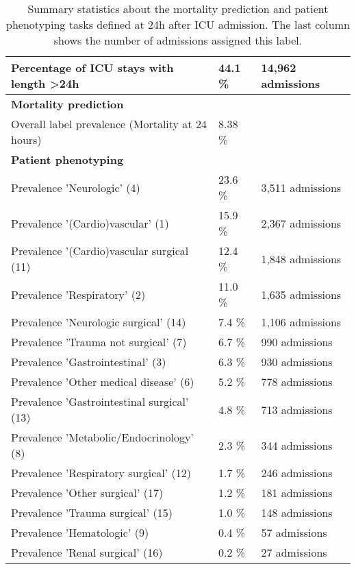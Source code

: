 \documentclass{article}
\begin{document}
\begin{table}[ht!]
\caption{Summary statistics about the mortality prediction and
patient phenotyping tasks defined at 24h after ICU admission. The last
column shows the number of admissions assigned this label.}
\footnotesize
\begin{center}
{\selectfont\small
\begin{tabular}{lll}
\toprule
Percentage of ICU stays with length >24h & 44.1 \% & 14,962 admissions \\
\midrule
\textbf{Mortality prediction} & & \\
\midrule
Overall label prevalence (Mortality at 24 hours) & 8.38 \% & \\
\midrule
\textbf{Patient phenotyping} & & \\
\midrule
Prevalence 'Neurologic' (4) & 23.6 \% & 3,511 admissions \\
Prevalence '(Cardio)vascular' (1) & 15.9 \% & 2,367 admissions \\
Prevalence '(Cardio)vascular surgical (11) & 12.4 \% & 1,848 admissions \\ 
Prevalence 'Respiratory' (2) & 11.0 \% & 1,635 admissions \\
Prevalence 'Neurologic surgical' (14) & 7.4 \% & 1,106 admissions \\
Prevalence 'Trauma not surgical' (7) & 6.7 \% & 990 admissions \\
Prevalence 'Gastrointestinal' (3) & 6.3 \% & 930 admissions \\ 
Prevalence 'Other medical disease' (6) & 5.2 \% & 778 admissions \\ 
Prevalence 'Gastrointestinal surgical' (13) & 4.8 \% & 713 admissions \\
Prevalence 'Metabolic/Endocrinology' (8) & 2.3 \% & 344 admissions \\ 
Prevalence 'Respiratory surgical' (12) & 1.7 \% & 246 admissions \\
Prevalence 'Other surgical' (17) & 1.2 \% & 181 admissions \\
Prevalence 'Trauma surgical' (15) & 1.0 \% & 148 admissions \\
Prevalence 'Hematologic' (9) & 0.4 \% & 57 admissions \\
Prevalence 'Renal surgical' (16) & 0.2 \% & 27 admissions \\ 
\bottomrule
\end{tabular}}
\end{center}
\label{tab:appendix-resp-failure-statistics}
\end{table}
\FloatBarrier
\end{document}
